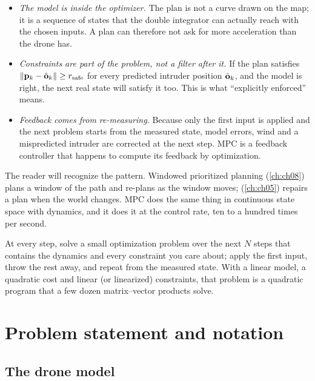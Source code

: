 \begin{itemize}
  \item \emph{The model is inside the optimizer.} The plan is not a curve
  drawn on the map; it is a sequence of states that the double integrator can
  actually reach with the chosen inputs. A plan can therefore not ask for more
  acceleration than the drone has.
  \item \emph{Constraints are part of the problem, not a filter after it.}
  If the plan satisfies $\left\lVert \mathbf{p}_k-\hat{\mathbf{o}}_k \right\rVert\ge r_{\mathrm{safe}}$
  for every predicted intruder position $\hat{\mathbf{o}}_k$, and the model is
  right, the next real state will satisfy it too. This is what
  ``explicitly enforced'' means.
  \item \emph{Feedback comes from re-measuring.} Because only the first input
  is applied and the next problem starts from the measured state, model errors,
  wind and a mispredicted intruder are corrected at the next step. MPC is a
  feedback controller that happens to compute its feedback by optimization.
\end{itemize}

The reader will recognize the pattern. Windowed prioritized planning
(\cref{ch:ch08}) plans a window of the path and re-plans as the window moves;
\dstarlite (\cref{ch:ch05}) repairs a plan when the world changes. MPC does
the same thing in continuous state space with dynamics, and it does it at the
control rate, ten to a hundred times per second.

\begin{keyidea}
At every step, solve a small optimization problem over the next $N$ steps that
contains the dynamics and every constraint you care about; apply the first
input, throw the rest away, and repeat from the measured state. With a linear
model, a quadratic cost and linear (or linearized) constraints, that problem
is a quadratic program that a few dozen matrix--vector products solve.
\end{keyidea}

\section{Problem statement and notation}
\label{sec:ch21-problem}

\subsection{The drone model}

